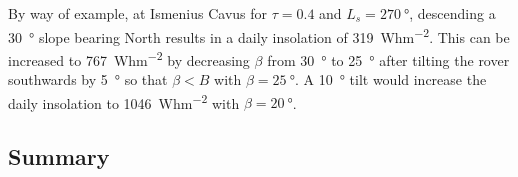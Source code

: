 
By way of example, at Ismenius Cavus for $\tau = 0.4$ and $L_{s}=\SI{270}{\degree}$, descending a \SI{30}{\degree} slope bearing North results in a daily insolation of \SI{319}{Whm^{-2}}. This can be increased to \SI{767}{Whm^{-2}} by decreasing $\beta$ from \SI{30}{\degree} to \SI{25}{\degree} after tilting the rover southwards by \SI{5}{\degree} so that $\beta < B$ with $\beta = \SI{25}{\degree}$. A \SI{10}{\degree} tilt would increase the daily insolation to \SI{1046}{Whm^{-2}} with $\beta = \SI{20}{\degree}$.


\subsection{Summary}

